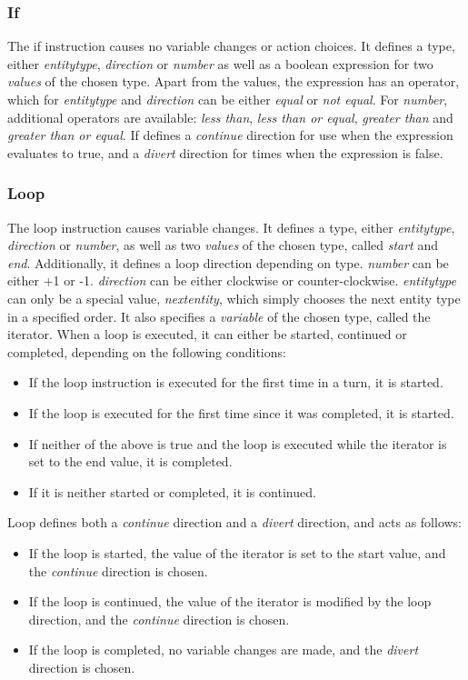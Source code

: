 \subsubsection{If}
The if instruction causes no variable changes or action choices. It defines a type, either \emph{entitytype}, \emph{direction} or \emph{number} as well as a boolean expression for two \emph{values} of the chosen type. Apart from the values, the expression has an operator, which for \emph{entitytype} and \emph{direction} can be either \emph{equal} or \emph{not equal}. For  \emph{number}, additional operators are available: \emph{less than}, \emph{less than or equal}, \emph{greater than} and \emph{greater than or equal}.
If defines a \emph{continue} direction for use when the expression evaluates to true, and a \emph{divert} direction for times when the expression is false.

\subsubsection{Loop}
The loop instruction causes variable changes. It defines a type, either \emph{entitytype}, \emph{direction} or \emph{number}, as well as two \emph{values} of the chosen type, called \emph{start} and \emph{end}. Additionally, it defines a loop direction depending on type. \emph{number} can be either +1 or -1. \emph{direction} can be either clockwise or counter-clockwise. \emph{entitytype} can only be a special value, \emph{nextentity}, which simply chooses the next entity type in a specified order. It also specifies a \emph{variable} of the chosen type, called the iterator. When a loop is executed, it can either be started, continued or completed, depending on the following conditions:
\begin{itemize}
\item If the loop instruction is executed for the first time in a turn, it is started.
\item If the loop is executed for the first time since it was completed, it is started.
\item If neither of the above is true and the loop is executed while the iterator is set to the end value, it is completed.
\item If it is neither started or completed, it is continued.
\end{itemize}
Loop defines both a \emph{continue} direction and a \emph{divert} direction, and acts as follows:
\begin{itemize}
\item If the loop is started, the value of the iterator is set to the start value, and the \emph{continue} direction is chosen.
\item If the loop is continued, the value of the iterator is modified by the loop direction, and the \emph{continue} direction is chosen.
\item If the loop is completed, no variable changes are made, and the \emph{divert} direction is chosen.
\end{itemize}
